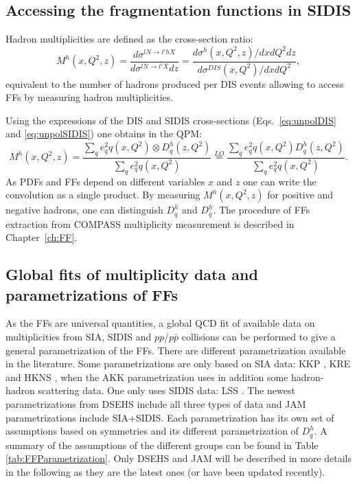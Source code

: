 \subsection{Accessing the fragmentation functions in SIDIS}

Hadron multiplicities are defined as the cross-section ratio:
%
\begin{equation}
  M^h(x,Q^2,z) = \frac{d\sigma^{lN \rightarrow l'hX}}{d\sigma^{lN \rightarrow l'X}dz} = \frac{d\sigma^h(x,Q^2,z)/dxdQ^2dz}{d\sigma^{DIS}(x,Q^2)/dxdQ^2},
\end{equation}
%
equivalent to the number of hadrons produced per DIS events allowing to access FFs by measuring hadron multiplicities.

Using the expressions of the DIS and SIDIS cross-sections (Eqs.~\ref{eq:unpolDIS} and \ref{eq:unpolSIDIS}) one obtains in the QPM:
%
\begin{equation}\label{eq:MFFPDF}
  M^h(x,Q^2,z) = \frac{\sum_q e^2_q q(x,Q^2) \otimes D^h_q(z,Q^2)}{\sum_q e^2_q q(x,Q^2)} \stackrel{LO}{=} \frac{\sum_q e^2_q q(x,Q^2) D^h_q(z,Q^2)}{\sum_q e^2_q q(x,Q^2)}.
\end{equation}
%
As PDFs and FFs depend on different variables $x$ and $z$ one can write the convolution as a single product. By measuring $M^h(x,Q^2,z)$ for positive and negative hadrons, one can distinguish $D^h_q$ and $D^h_{\bar{q}}$. The procedure of FFs extraction from COMPASS multiplicity measurement is described in Chapter~\ref{ch:FF}.

\subsection{Global fits of multiplicity data and parametrizations of FFs}

As the FFs are universal quantities, a global QCD fit of available data on multiplicities from SIA, SIDIS and $pp$/$p\bar{p}$ collisions can be performed to give a general parametrization of the FFs. There are different parametrization available in the literature. Some parametrizations are only based on SIA data: KKP \cite{Universality}, KRE \cite{KRE} and HKNS \cite{HKNS}, when the AKK \cite{AKK} parametrization uses in addition some hadron-hadron scattering data. One only uses SIDIS data: LSS \cite{LSS}. The newest parametrizations from DSEHS \cite{DSEHS1,DSEHS2} include all three types of data and JAM \cite{JAM} parametrizations include SIA+SIDIS. Each parametrization has its own set of assumptions based on symmetries and its different parametrization of $D^h_q$. A summary of the assumptions of the different groups can be found in Table \ref{tab:FFParametrization}. Only DSEHS and JAM will be described in more details in the following as they are the latest ones (or have been updated recently).


